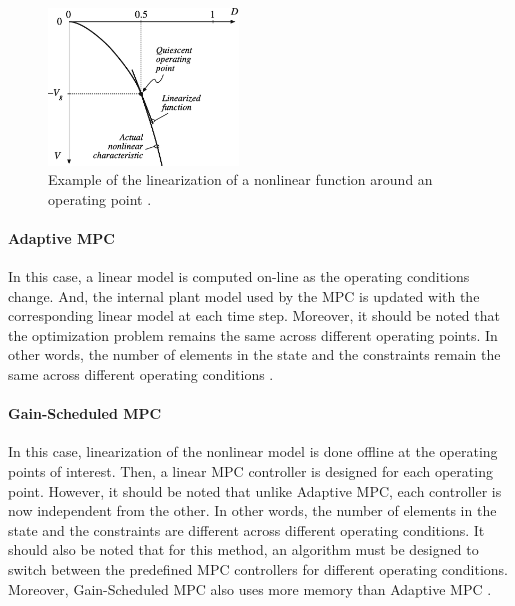 \documentclass{thesisreport}
\begin{document}
\begin{figure}[h]
\centering
\includegraphics[width=0.45\textwidth]{Images/Control/linearization}
\caption{Example of the linearization of a nonlinear function around an operating point \cite{Erickson2020}.}
\label{nonlinear_function_linearization}
\label{non_convex_function}
\end{figure}



\paragraph{Adaptive MPC} In this case, a linear model is computed on-line as the operating conditions change. And, the internal plant model used by the MPC is updated with the corresponding linear model at each time step. Moreover, it should be noted that the optimization problem remains the same across different operating points. In other words, the number of elements in the state and the constraints remain the same across different operating conditions \cite{Bujarbaruah2018}.

\paragraph{Gain-Scheduled MPC} In this case, linearization of the nonlinear model is done offline at the operating points of interest. Then, a linear MPC controller is designed for each operating point. However, it should be noted that unlike Adaptive MPC, each controller is now independent from the other. In other words, the number of elements in the state and the constraints are different across different operating conditions.
It should also be noted that for this method, an algorithm must be designed to switch between the predefined MPC controllers for different operating conditions. Moreover, Gain-Scheduled MPC also uses more memory than Adaptive MPC \cite{7347864}.
\end{document}

